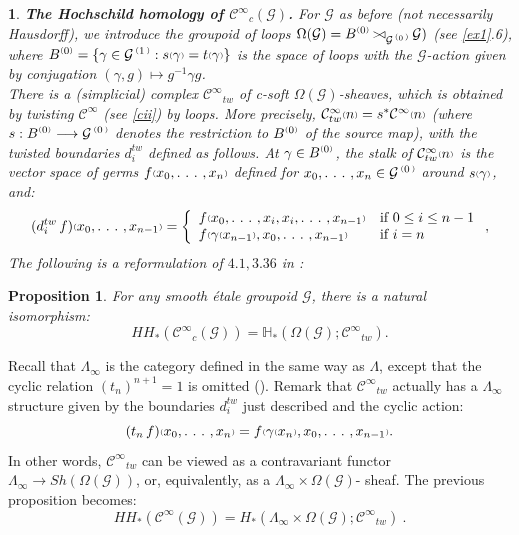 \documentclass[a4paper]{article}
\newtheorem{prop}[st]{Proposition}
\newtheorem{num}[st]{}
\newcommand{\rmap}{\longrightarrow}
\newcommand{\G}{\ensuremath{\mathcal{G}}}
\newcommand{\C}{\ensuremath{\mathcal{C}}}
\newcommand{\cii}{\ensuremath{\C^{\infty}}}
\newcommand{\ps}{{\raise 1pt\hbox{\tiny (}}}
\newcommand{\pd}{{\raise 1pt\hbox{\tiny )}}}
\newcommand{\nG}[1]{\ensuremath{\G^{\,\ps #1\,\pd}}}
\def\cross{\mathinner{\mathrel{\raise0.8pt\hbox{$\scriptstyle>$}}
                 \joinrel\mathrel\triangleleft}}
\newcommand{\nB}[1]{\ensuremath{B^{\ps #1\pd}}}
\begin{document}
\begin{num}
\emph{
{\bf The Hochschild homology of $\cii_c(\G)$.} For $\G$ as before (not necessarily Hausdorff), we introduce the groupoid of loops $\Omega(\G)= \nB{0}\cross_{\nG{0}}\G)$ (see \ref{ex1}.6), where $\nB{0}=\{ \gamma\in \nG{1}: s\ps\gamma\pd = t\ps\gamma\pd \}$ is the space of loops with the $\G$-action given by conjugation $(\gamma, g) \mapsto g^{-1}\gamma g$.\\
\hspace*{.3in} There is a (simplicial) complex $\cii_{tw}$ of c-soft $\Omega(\G)$-sheaves, which is obtained by twisting $\cii$ (see \ref{cii}) by loops. More precisely, $\cii_{tw}\ps n\pd= s^{*}\cii\ps n\pd$ (where $s: \nB{0} \rmap \nG{0}$ denotes the restriction to $\nB{0}$ of the source map), with the twisted boundaries $d_i^{tw}$ defined as follows. At $\gamma \in \nB{0}$, the stalk of $\cii_{tw}\ps n\pd$ is the vector space of germs $f\ps x_0, .\ .\ .\ , x_n\pd$ defined for $x_0, .\ .\ .\ , x_n \in \nG{0}$ around $s\ps \gamma\pd$, and:
\[ (d_i^{tw}\, f)\ps x_0, .\ .\ .\ , x_{n- 1}\pd = \left\{ \begin{array}{ll}
                                                       f\ps x_0, .\ .\ .\ , x_i, x_i, .\ .\ .\ , x_{n- 1}\pd & \mbox{if $0 \leq i \leq n-1$} \\
                                                       f\ps \gamma\ps x_{n- 1}\pd , x_0, .\ .\ .\ , x_{n- 1}\pd & \mbox{if $i=n$}
                                                \end{array}
                                        \right. ,\]
The following is a reformulation of $4.1, 3.36$ in \cite{Cra}:
}
\end{num}

\begin{prop}
\label{hoch} For any smooth \'etale groupoid $\G$, there is a natural isomorphism:
\[ HH_{*}(\cii_c(\G))= \mathbb{H}_{*}(\Omega(\G); \cii_{tw}).\]
\end{prop}


Recall that $\Lambda_{\infty}$ is the category defined in the same way as $\Lambda$, except that the cyclic relation $(t_n)^{n+ 1}= 1$ is omitted (\cite{FeTs}). Remark that $\cii_{tw}$ actually has a $\Lambda_{\infty}$ structure given by the boundaries $d_i^{tw}$ just described and the cyclic action:
\[ (t_n\, f)\ps x_0, .\ .\ .\ , x_n\pd = f\ps \gamma\ps x_n\pd , x_0, .\ .\ .\ , x_{n- 1}\pd .\]
In other words, $\cii_{tw}$ can be viewed as a contravariant functor $\Lambda_{\infty} \rmap Sh(\Omega(\G))$, or, equivalently, as a $\Lambda_{\infty}\times\Omega(\G)$- sheaf. The previous proposition becomes:
\begin{equation}
\label{relc1}
HH_{*}(\cii(\G)) = H_{*}(\Lambda_{\infty}\times\Omega(\G); \cii_{tw}) \ .
\end{equation}
\end{document}
